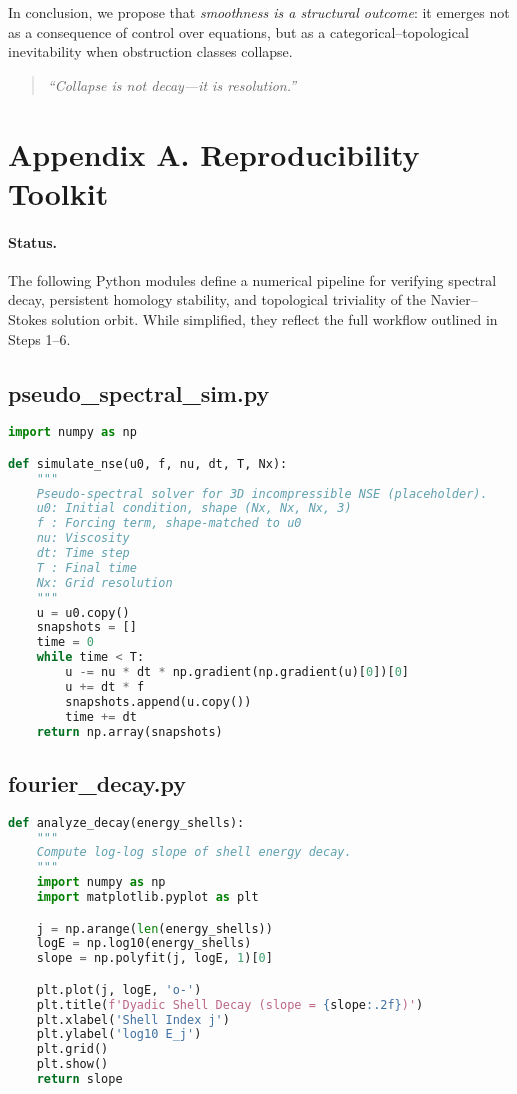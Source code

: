 \documentclass[11pt]{article}
\theoremstyle{definition}
\begin{document}
\medskip

\noindent
In conclusion, we propose that \emph{smoothness is a structural outcome}:  
it emerges not as a consequence of control over equations, but as a categorical–topological inevitability when obstruction classes collapse.

\begin{quote}
\textit{“Collapse is not decay—it is resolution.”}
\end{quote}



\section{Appendix A. Reproducibility Toolkit}
\label{sec:appendixA}

\paragraph{Status.}
The following Python modules define a numerical pipeline for verifying spectral decay, persistent homology stability, and topological triviality of the Navier--Stokes solution orbit. While simplified, they reflect the full workflow outlined in Steps 1–6.

\subsection*{pseudo\_spectral\_sim.py}
\begin{lstlisting}[language=Python]
import numpy as np

def simulate_nse(u0, f, nu, dt, T, Nx):
    """
    Pseudo-spectral solver for 3D incompressible NSE (placeholder).
    u0: Initial condition, shape (Nx, Nx, Nx, 3)
    f : Forcing term, shape-matched to u0
    nu: Viscosity
    dt: Time step
    T : Final time
    Nx: Grid resolution
    """
    u = u0.copy()
    snapshots = []
    time = 0
    while time < T:
        u -= nu * dt * np.gradient(np.gradient(u)[0])[0]
        u += dt * f
        snapshots.append(u.copy())
        time += dt
    return np.array(snapshots)
\end{lstlisting}

\subsection*{fourier\_decay.py}
\begin{lstlisting}[language=Python]
def analyze_decay(energy_shells):
    """
    Compute log-log slope of shell energy decay.
    """
    import numpy as np
    import matplotlib.pyplot as plt

    j = np.arange(len(energy_shells))
    logE = np.log10(energy_shells)
    slope = np.polyfit(j, logE, 1)[0]

    plt.plot(j, logE, 'o-')
    plt.title(f'Dyadic Shell Decay (slope = {slope:.2f})')
    plt.xlabel('Shell Index j')
    plt.ylabel('log10 E_j')
    plt.grid()
    plt.show()
    return slope
\end{lstlisting}
\end{document}
